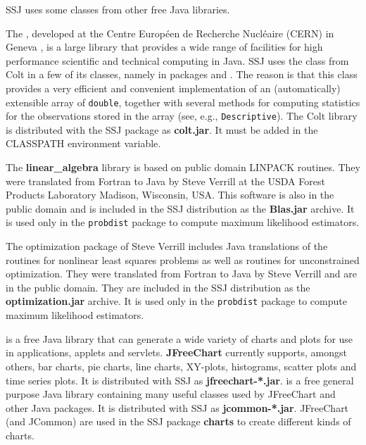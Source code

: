 SSJ uses some classes from other free Java libraries.

The ,
 developed at the Centre Europ\'een de Recherche
Nucl\'eaire (CERN) in Geneva \cite{iHOS04a},
is a large library that provides a wide range of facilities for
high performance scientific and technical computing in Java.
SSJ uses the class 
from Colt in a few of its classes, namely in packages
 and
.
The reason is that this class provides a very efficient and convenient
implementation of an (automatically) extensible array of {\tt double},
together with several methods for computing statistics for the observations
stored in the array (see, e.g., {\tt Descriptive}).
The Colt library is distributed with the SSJ package as \textbf{colt.jar}.
It  must be added in the CLASSPATH environment variable.


The \textbf{linear\_algebra} library is based on public domain LINPACK routines.
They were translated from Fortran to Java by Steve Verrill at the
    USDA Forest Products Laboratory
    Madison, Wisconsin, USA.
This software is also in the public domain and is included in the
SSJ distribution as the \textbf{Blas.jar} archive. It is used only in the
\texttt{probdist} package to compute maximum likelihood estimators.


The optimization package of Steve Verrill includes Java translations of the
 routines \cite{iMOR80a} for  nonlinear least squares problems as well as
 routines \cite{iSCHa} for
unconstrained optimization. They were translated from Fortran to Java by
Steve Verrill and are in the public domain. They are included in the SSJ
distribution as the \textbf{optimization.jar} archive. It is used only in the \texttt{probdist}
 package to compute maximum likelihood estimators.


 is a free
Java library that can generate a wide variety of charts and plots for use in
applications, applets and servlets. \textbf{JFreeChart}  currently supports, amongst
others, bar charts, pie charts, line charts, XY-plots, histograms, scatter plots and
time series plots. It is distributed with SSJ as \textbf{jfreechart-*.jar}.
 is a free
general purpose Java library containing many useful classes used by JFreeChart and
 other Java packages. It is distributed with SSJ as \textbf{jcommon-*.jar}.
JFreeChart (and JCommon) are used in the SSJ package \textbf{charts} to create
different kinds of charts.

